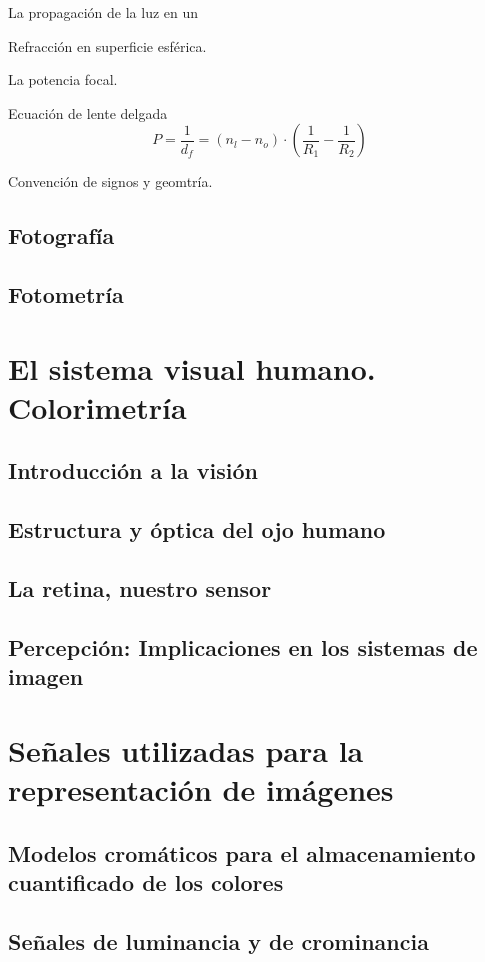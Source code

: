 \documentclass[a4paper]{book}
\begin{document}
La propagación de la luz en un

Refracción en superficie esférica.

La potencia focal.

Ecuación de lente delgada
\[ P=\frac{1}{d_f}=\left( n_l-n_o \right) \cdot \left( \frac{1}{R_1} - \frac{1}{R_2}  \right)  \]

Convención de signos y geomtría.

\section{Fotografía}

\section{Fotometría}

\chapter{El sistema visual humano. Colorimetría}
\section{Introducción a la visión}
\section{Estructura y óptica del ojo humano}
\section{La retina, nuestro sensor}
\section{Percepción: Implicaciones en los sistemas de imagen}

\chapter{Señales utilizadas para la representación de imágenes}
\section{Modelos cromáticos para el almacenamiento cuantificado de los colores}
\section{Señales de luminancia y de crominancia}
\end{document}
